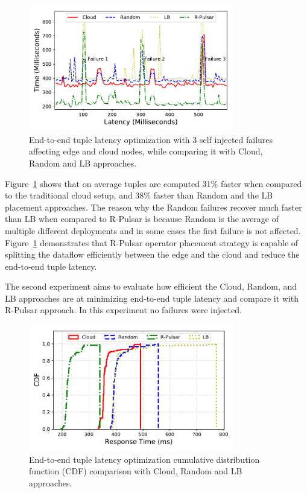 \begin{figure}[h!]
  \centering
  \includegraphics[width=0.8\textwidth]{Results/Latency.pdf}
  \caption{End-to-end tuple latency optimization with 3 self injected failures affecting edge and cloud nodes, while comparing it with Cloud, Random and LB approaches.}
  \label{fig:latency}
\end{figure} 


Figure~\ref{fig:latency} shows that on average tuples are computed 31\% faster when compared to the traditional cloud setup, and 38\% faster than Random and the LB placement approaches. The reason why the Random failures recover much faster than LB when compared to R-Pulsar is because Random is the average of multiple different deployments and in some cases the first failure is not affected. Figure~\ref{fig:latency} demonstrates that R-Pulsar operator placement strategy is capable of splitting the dataflow efficiently between the edge and the cloud and reduce the end-to-end tuple latency.

The second experiment aims to evaluate how efficient the Cloud, Random, and LB approaches are at minimizing end-to-end tuple latency and compare it with R-Pulsar approach. In this experiment no failures were injected.

\begin{figure}[h!]
  \centering
  \includegraphics[width=0.8\textwidth]{Results/CDF_latency.pdf}
  \caption{End-to-end tuple latency optimization cumulative distribution function (CDF) comparison with Cloud, Random and LB approaches.}
  \label{fig:CDFLatency}
\end{figure} 

